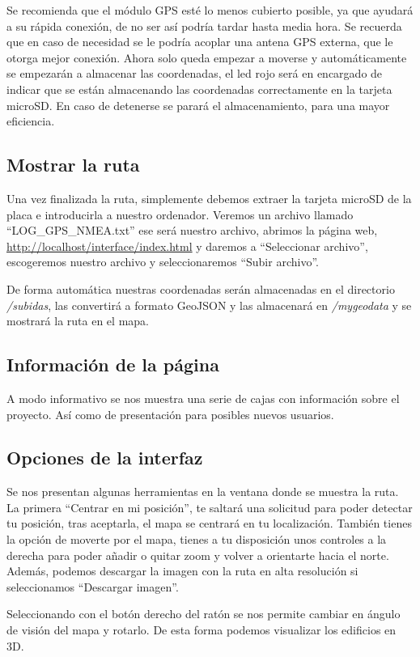 Se recomienda que el módulo GPS esté lo menos cubierto posible, ya que ayudará a su rápida conexión, de no ser así podría tardar hasta media hora. Se recuerda que en caso de necesidad se le podría acoplar una antena GPS externa, que le otorga mejor conexión. Ahora solo queda empezar a moverse y automáticamente se empezarán a almacenar las coordenadas, el led rojo será en encargado de indicar que se están almacenando las coordenadas correctamente en la tarjeta microSD. En caso de detenerse se parará el almacenamiento, para una mayor eficiencia.

\subsection{Mostrar la ruta}
Una vez finalizada la ruta, simplemente debemos extraer la tarjeta microSD de la placa e introducirla a nuestro ordenador. Veremos un archivo llamado ``LOG\_GPS\_NMEA.txt'' ese será nuestro archivo, abrimos la página web, \url{http://localhost/interface/index.html} y daremos a ``Seleccionar archivo'', escogeremos nuestro archivo y seleccionaremos ``Subir archivo''.

De forma automática nuestras coordenadas serán almacenadas en el directorio \textit{/subidas}, las convertirá a formato GeoJSON y las almacenará en \textit{/mygeodata} y se mostrará la ruta en el mapa.

\subsection{Información de la página}
A modo informativo se nos muestra una serie de cajas con información sobre el proyecto. Así como de presentación para posibles nuevos usuarios.

\subsection{Opciones de la interfaz}
Se nos presentan algunas herramientas en la ventana donde se muestra la ruta. La primera ``Centrar en mi posición'', te saltará una solicitud para poder detectar tu posición, tras aceptarla, el mapa se centrará en tu localización. También tienes la opción de moverte por el mapa, tienes a tu disposición unos controles a la derecha para poder añadir o quitar zoom y volver a orientarte hacia el norte. Además, podemos descargar la imagen con la ruta en alta resolución si seleccionamos ``Descargar imagen''.

Seleccionando con el botón derecho del ratón se nos permite cambiar en ángulo de visión del mapa y rotarlo. De esta forma podemos visualizar los edificios en 3D.
